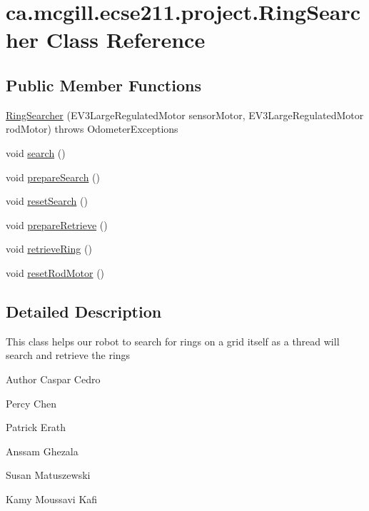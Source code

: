\hypertarget{classca_1_1mcgill_1_1ecse211_1_1project_1_1_ring_searcher}{}\section{ca.\+mcgill.\+ecse211.\+project.\+Ring\+Searcher Class Reference}
\label{classca_1_1mcgill_1_1ecse211_1_1project_1_1_ring_searcher}
\subsection*{Public Member Functions}
\begin{DoxyCompactItemize}
\item 
\hyperlink{classca_1_1mcgill_1_1ecse211_1_1project_1_1_ring_searcher_a37eebb6cbdfd692e0979c3ca0fe2597b}{Ring\+Searcher} (E\+V3\+Large\+Regulated\+Motor sensor\+Motor, E\+V3\+Large\+Regulated\+Motor rod\+Motor)  throws Odometer\+Exceptions 
\item 
void \hyperlink{classca_1_1mcgill_1_1ecse211_1_1project_1_1_ring_searcher_a7ff5756046a0ce992ed8cb8954139c3b}{search} ()
\item 
void \hyperlink{classca_1_1mcgill_1_1ecse211_1_1project_1_1_ring_searcher_abf31c36cadb144a4651b11f7fa37120a}{prepare\+Search} ()
\item 
void \hyperlink{classca_1_1mcgill_1_1ecse211_1_1project_1_1_ring_searcher_ad73c50b29163d91292de418101cce21e}{reset\+Search} ()
\item 
void \hyperlink{classca_1_1mcgill_1_1ecse211_1_1project_1_1_ring_searcher_a3de30b85b1445157d7f8572992de7651}{prepare\+Retrieve} ()
\item 
void \hyperlink{classca_1_1mcgill_1_1ecse211_1_1project_1_1_ring_searcher_afca3a0c746b07abb88881d926f4fe71f}{retrieve\+Ring} ()
\item 
void \hyperlink{classca_1_1mcgill_1_1ecse211_1_1project_1_1_ring_searcher_a8b0ea0bf4cd07b6c8a090c3e9bc8eb04}{reset\+Rod\+Motor} ()
\end{DoxyCompactItemize}


\subsection{Detailed Description}
This class helps our robot to search for rings on a grid itself as a thread will search and retrieve the rings

\begin{DoxyAuthor}{Author}
Caspar Cedro 

Percy Chen 

Patrick Erath 

Anssam Ghezala 

Susan Matuszewski 

Kamy Moussavi Kafi 
\end{DoxyAuthor}


